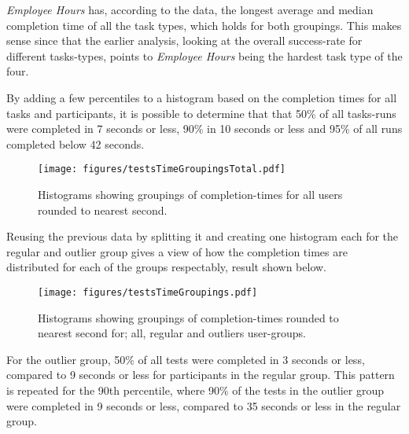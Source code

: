     \textit{Employee Hours} has, according to the data, the longest average
    and median completion time of all the task types, which holds for both
    groupings. This makes sense since that the earlier analysis, looking at
    the overall success-rate for different tasks-types, points to
    \textit{Employee Hours} being the hardest task type of the four.

    By adding a few percentiles to a histogram based on the completion times for all
    tasks and participants, it is possible to determine that that 50\% of
    all tasks-runs were completed in 7 seconds or less, 90\% in 10 seconds
    or less and 95\% of all runs completed below 42 seconds.

    \begin{figure}[h!]
      \centering
      \texttt{[image: figures/testsTimeGroupingsTotal.pdf]}
      \caption{
        Histograms showing groupings of completion-times for all users
        rounded to nearest second.
      }
    \end{figure}


    Reusing the previous data by splitting it and creating one histogram
    each for the regular and outlier group gives a view of how the completion
    times are distributed for each of the groups respectably, result shown
    below.

    \begin{figure}[h!]
      \centering
      \texttt{[image: figures/testsTimeGroupings.pdf]}
      \caption{
        Histograms showing groupings of completion-times rounded to nearest
        second for; all, regular and outliers user-groups.
      }
    \end{figure}

    For the outlier group, 50\% of all tests were completed in 3 seconds or
    less, compared to 9 seconds or less for participants in the regular
    group. This pattern is repeated for the 90th percentile, where 90\% of
    the tests in the outlier group were completed in 9 seconds or less,
    compared to 35 seconds or less in the regular group.

%
%
%

